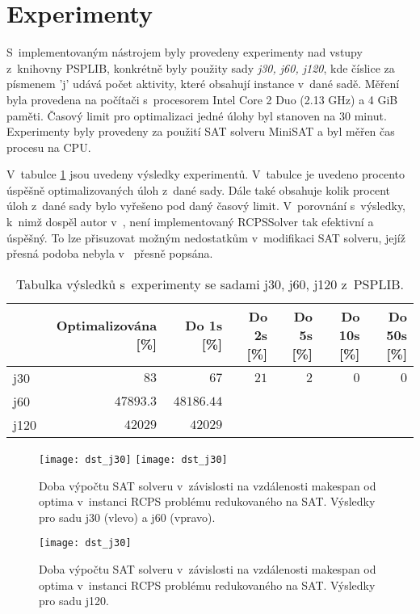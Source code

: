 \documentclass[a4paper, 12pt]{article}
\begin{document}
\section{Experimenty}
S~implementovaným nástrojem byly provedeny experimenty nad vstupy
z~knihovny PSPLIB, konkrétně byly použity sady \emph{j30, j60, j120}, kde
číslice za písmenem 'j' udává počet aktivity, které obsahují instance v~dané sadě.
Měření byla provedena na počítači s~procesorem Intel Core 2 Duo (2.13 GHz) a 4 GiB paměti.
Časový limit pro optimalizaci jedné úlohy byl stanoven na $30$ minut.
Experimenty byly provedeny za použití SAT solveru MiniSAT a byl měřen čas
procesu na CPU.

V~tabulce \ref{table:jreses} jsou uvedeny výsledky experimentů.
V~tabulce je uvedeno procento úspěšně optimalizovaných úloh z~dané sady.
Dále také obsahuje kolik procent úloh z~dané sady bylo vyřešeno pod daný časový limit.
V~porovnání s~výsledky, k~nimž dospěl autor v~\cite{horbach:10}, není implementovaný
RCPSSolver tak efektivní a úspěšný.
To lze přisuzovat možným nedostatkům v~modifikaci SAT solveru, jejíž přesná podoba nebyla
v~\cite{horbach:10} přesně popsána.

\begin{table}[tb]
\begin{center}
  \begin{tabular}{ | l | r | r | r | r | r | r |}
   \hline
    & \textbf{Optimalizována [\%]} & Do 1s [\%] & Do 2s [\%] & Do 5s [\%] & Do 10s [\%] & Do 50s [\%]\\ \hline \hline
    j30 &$83$ & $67$ & $21$  &$2$ & $0$ & $0$ \\ \hline
    j60 & $47893.3$ & $48186.44$ & & & \\ \hline
    j120 & $42 029$ & $42 029$ & & & \\ \hline
   \end{tabular}
   \caption{Tabulka výsledků s~experimenty se sadami j30, j60, j120 z~PSPLIB.}
   \label{table:jreses}
\end{center}
\end{table}

\begin{figure}[tb]
    \texttt{[image: dst\_j30]}
    \texttt{[image: dst\_j30]}
    \caption{Doba výpočtu SAT solveru v~závislosti na vzdálenosti makespan od optima v~instanci RCPS problému redukovaného na SAT.
    Výsledky pro sadu j30 (vlevo) a j60 (vpravo).}
    \label{pic:j30}
\end{figure}
\begin{figure}[tb]
    \begin{center}
    \texttt{[image: dst\_j30]}
    \end{center}
    \caption{Doba výpočtu SAT solveru v~závislosti na vzdálenosti makespan od optima v~instanci RCPS problému redukovaného na SAT.
    Výsledky pro sadu j120.}
    \label{pic:j120}
\end{figure}
\end{document}
